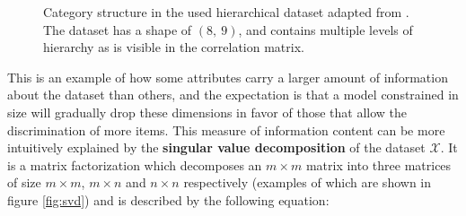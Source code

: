 \documentclass[11pt]{article}
\theoremstyle{remark}
\begin{document}
\begin{figure}%
  \centering
  \caption{Category structure in the used hierarchical dataset adapted from \cite{rogers2004semantic}. The dataset has a shape of $(8,\ 9)$, and contains multiple levels of hierarchy as is visible in the correlation matrix.}%
  \label{fig:data}%
\end{figure}

This is an example of how some attributes carry a larger amount of information about the dataset than others, and the expectation is that a model constrained in size will gradually drop these dimensions in favor of those that allow the discrimination of more items. This measure of information content can be more intuitively explained by the \textbf{singular value decomposition} of the dataset $\mathcal{X}$. It is a matrix factorization which decomposes an $m \times m$ matrix into three matrices of size $m \times m$, $m \times n$ and $n \times n$ respectively (examples of which are shown in figure \ref{fig:svd}) and is described by the following equation:
\end{document}
